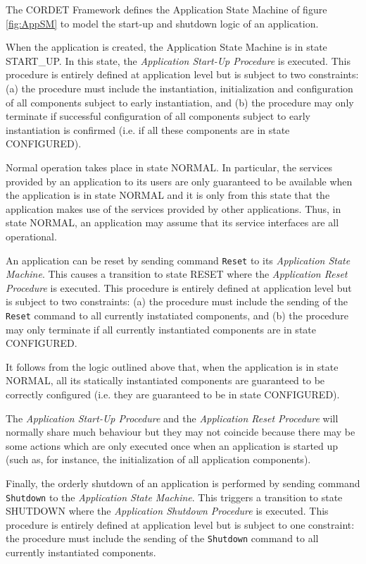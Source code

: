The CORDET Framework defines the Application State Machine of figure \ref{fig:AppSM} to model the start-up and shutdown logic of an application. 

When the application is created, the Application State Machine is in state START\_UP. 
In this state, the \textit{Application Start-Up Procedure} is executed. 
This procedure is entirely defined at application level but is subject to two constraints: (a) the procedure must include the instantiation, initialization and configuration of all components subject to early instantiation, and (b) the procedure may only terminate if successful configuration of all components subject to early instantiation is confirmed (i.e. if all these components are in state CONFIGURED). 

Normal operation takes place in state NORMAL. 
In particular, the services provided by an application to its users are only guaranteed to be available when the application is in state NORMAL and it is only from this state that the application makes use of the services provided by other applications. 
Thus, in state NORMAL, an application may assume that its service interfaces are all operational.

An application can be reset by sending command \texttt{Reset} to its \textit{Application State Machine}. This causes a transition to state RESET where the \textit{Application Reset Procedure} is executed. This procedure is entirely defined at application level but is subject to two constraints: (a) the procedure must include the sending of the \texttt{Reset} command to all currently instatiated components, and (b) the procedure may only terminate if all currently instantiated components are in state CONFIGURED.

It follows from the logic outlined above that, when the application is in state NORMAL, all its statically instantiated components are guaranteed to be correctly configured (i.e. they are guaranteed to be in state CONFIGURED).

The \textit{Application Start-Up Procedure} and the \textit{Application Reset Procedure} will normally share much behaviour but they may not coincide because there may be some actions which are only executed once when an application is started up (such as, for instance, the initialization of all application components).

Finally, the orderly shutdown of an application is performed by sending command \texttt{Shutdown} to the \textit{Application State Machine}. This triggers a transition to state SHUTDOWN where the \textit{Application Shutdown Procedure} is executed. This procedure is entirely defined at application level but is subject to one constraint: the procedure must include the sending of the \texttt{Shutdown} command to all currently instantiated components. 

